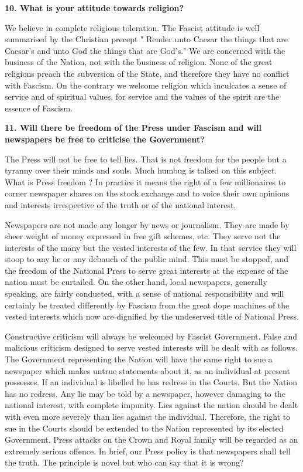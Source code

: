 \documentclass{book}
\begin{document}
\begin{flushleft}
\textbf{10. What is your attitude towards religion?}

We believe in complete religious toleration. The Fascist attitude is well summarised by the
Christian precept " Render unto Caesar the things that are Caesar's and unto God the things that
are God's."
We are concerned with the business of the Nation, not with the business of religion. None of the
great religions preach the subversion of the State, and therefore they have no conflict with
Fascism. On the contrary we welcome religion which inculcates a sense of service and of spiritual values, for service and the values
of the spirit are the essence of Fascism.
\end{flushleft}

\begin{flushright}
\textbf{11. Will there be freedom of the Press under Fascism and
    will newspapers be free to criticise the Government?}

The Press will not be free to tell lies. That is not freedom for the people but a tyranny over their
minds and souls. Much humbug is talked on this subject. What is Press freedom ? In practice it
means the right of a few millionaires to corner newspaper shares on the stock exchange and to
voice their own opinions and interests irrespective of the truth or of the national interest.

Newspapers are not made any longer by news or journalism. They are made by sheer weight of
money expressed in free gift schemes, etc. They serve not the interests of the many but the
vested interests of the few. In that service they will stoop to any lie or any debauch of the public
mind. This must be stopped, and the freedom of the National Press to serve great interests at the
expense of the nation must be curtailed. On the other hand, local newspapers, generally speaking,
are fairly conducted, with a sense of national responsibility and will certainly be treated
differently by Fascism from the great dope machines of the vested interests which now are
dignified by the undeserved title of National Press.

Constructive criticism will always be welcomed by Fascist Government. False and malicious
criticism designed to serve vested interests will be dealt with as follows. The Government
representing the Nation will have the same right to sue a newspaper which makes untrue
statements about it, as an individual at present possesses. If an individual is libelled he has
redress in the Courts. But the Nation has no redress. Any lie may be told by a newspaper,
however damaging to the national interest, with complete impunity. Lies against the nation
should be dealt with even more severely than lies against the individual. Therefore, the right to
sue in the Courts should be extended to the Nation represented by its elected Government. Press attacks on the Crown and Royal family will be regarded as an extremely serious offence. In brief,
our Press policy is that newspapers shall tell the truth. The principle is novel but who can say that it is wrong?
\end{flushright}
\end{document}
